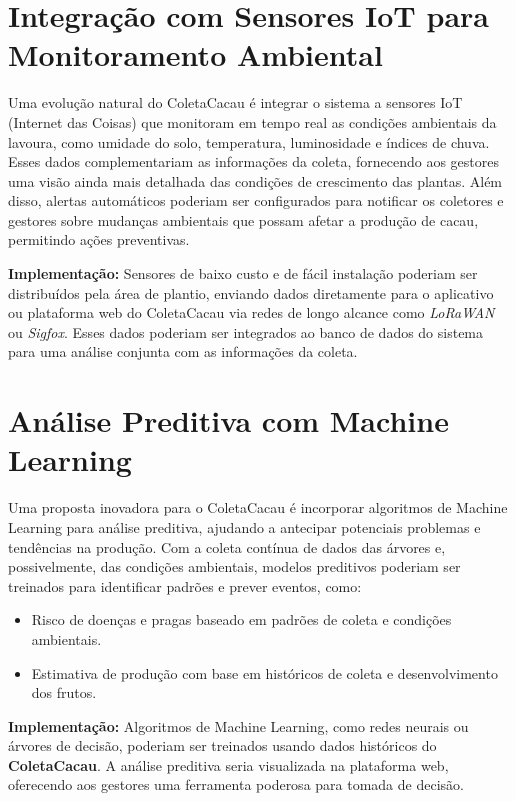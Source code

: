 \section{Integração com Sensores IoT para Monitoramento Ambiental}
Uma evolução natural do ColetaCacau é integrar o sistema a sensores IoT (Internet das Coisas) que monitoram em tempo real as condições ambientais da lavoura, como umidade do solo, temperatura, luminosidade e índices de chuva. Esses dados complementariam as informações da coleta, fornecendo aos gestores uma visão ainda mais detalhada das condições de crescimento das plantas. Além disso, alertas automáticos poderiam ser configurados para notificar os coletores e gestores sobre mudanças ambientais que possam afetar a produção de cacau, permitindo ações preventivas.

\textbf{Implementação:} Sensores de baixo custo e de fácil instalação poderiam ser distribuídos pela área de plantio, enviando dados diretamente para o aplicativo ou plataforma web do ColetaCacau via redes de longo alcance como \textit{LoRaWAN} ou \textit{Sigfox}. Esses dados poderiam ser integrados ao banco de dados do sistema para uma análise conjunta com as informações da coleta.

\section{Análise Preditiva com Machine Learning}
Uma proposta inovadora para o ColetaCacau é incorporar algoritmos de Machine Learning para análise preditiva, ajudando a antecipar potenciais problemas e tendências na produção. Com a coleta contínua de dados das árvores e, possivelmente, das condições ambientais, modelos preditivos poderiam ser treinados para identificar padrões e prever eventos, como:

\begin{itemize} 
    \item Risco de doenças e pragas baseado em padrões de coleta e condições ambientais.
    
    \item Estimativa de produção com base em históricos de coleta e desenvolvimento dos frutos.
\end{itemize}

\textbf{Implementação:} Algoritmos de Machine Learning, como redes neurais ou árvores de decisão, poderiam ser treinados usando dados históricos do \textbf{ColetaCacau}. A análise preditiva seria visualizada na plataforma web, oferecendo aos gestores uma ferramenta poderosa para tomada de decisão.

